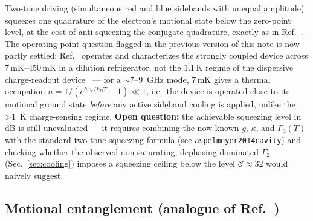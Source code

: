 \documentclass[aps,prapplied,reprint,superscriptaddress,longbibliography]{revtex4-2}
\begin{document}
Two-tone driving (simultaneous red and blue sidebands with unequal amplitude) squeezes one
quadrature of the electron's motional state below the zero-point level, at the cost of anti-squeezing
the conjugate quadrature, exactly as in Ref.~\cite{pirkkalainen2015squeezing}. The operating-point
question flagged in the previous version of this note is now partly settled:
Ref.~\cite{koolstra2026strong} operates and characterizes the strongly coupled device across
$7\,\mathrm{mK}$--$450\,\mathrm{mK}$ in a dilution refrigerator, not the $1.1\,\mathrm{K}$ regime of
the dispersive charge-readout device~\cite{castoria2025} — for a $\sim$7--9~GHz mode, $7\,\mathrm{mK}$
gives a thermal occupation $\bar n = 1/(e^{\hbar\omega_e/k_BT}-1) \ll 1$, i.e.\ the device is
operated close to its motional ground state \emph{before} any active sideband cooling is applied,
unlike the >1~K charge-sensing regime. \textbf{Open question:} the achievable squeezing level in dB
is still unevaluated — it requires combining the now-known $g$, $\kappa$, and $\Gamma_2(T)$ with the
standard two-tone-squeezing formula (see \texttt{aspelmeyer2014cavity}) and checking whether the
observed non-saturating, dephasing-dominated $\Gamma_2$ (Sec.~\ref{sec:cooling}) imposes a squeezing
ceiling below the level $\mathcal{C}\approx32$ would naively suggest.

\subsection{Motional entanglement (analogue of Ref.~\cite{ockeloenkorppi2018stabilized})}
\label{sec:entanglement}
\end{document}
